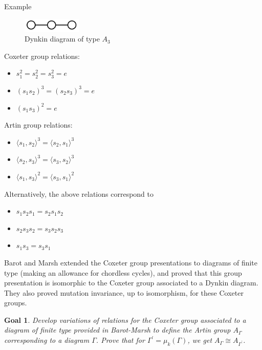 \documentclass{beamer}
\newtheorem{goal}{Goal}
\begin{document}
\begin{frame}{Example}
\begin{figure}
\centering
\includegraphics[scale = .65]{DynkinA3.PNG}
\caption{Dynkin diagram of type $A_3$}
\end{figure}

Coxeter group relations:
\begin{itemize}
\item $s_1^2 = s_2^2 = s_3^2 = e$
\item $(s_1s_2)^3 = (s_2s_3)^3 = e$
\item $(s_1s_3)^2 = e$
\end{itemize}

Artin group relations:
\begin{itemize}
\item $\langle s_1, s_2 \rangle ^3 = \langle s_2, s_1 \rangle ^3$
\item $\langle s_2, s_3 \rangle ^3 = \langle s_3, s_2 \rangle ^3$
\item $\langle s_1, s_3 \rangle ^2 = \langle s_3, s_1 \rangle ^2$
\end{itemize}
Alternatively, the above relations correspond to 
\begin{itemize}
\item $s_1s_2s_1 = s_2s_1s_2$
\item $s_2s_3s_2 = s_3s_2s_3$
\item $s_1s_3 = s_3s_1$
\end{itemize}

\end{frame}


\begin{frame}
Barot and Marsh extended the Coxeter group presentations to diagrams of finite type (making an allowance for chordless cycles), and proved that this group presentation is isomorphic to the Coxeter group associated to a Dynkin diagram. They also proved mutation invariance, up to isomorphism, for these Coxeter groups.

\pause
\begin{goal}
Develop variations of relations for the Coxeter group associated to a diagram of finite type provided in Barot-Marsh to define the Artin group $A_{\Gamma}$ corresponding to a diagram $\Gamma$. Prove that for $\Gamma^{\prime} = \mu_k(\Gamma)$, we get $A_{\Gamma} \cong A_{\Gamma^{\prime}}$. 
\end{goal}
\end{frame}
\end{document}
